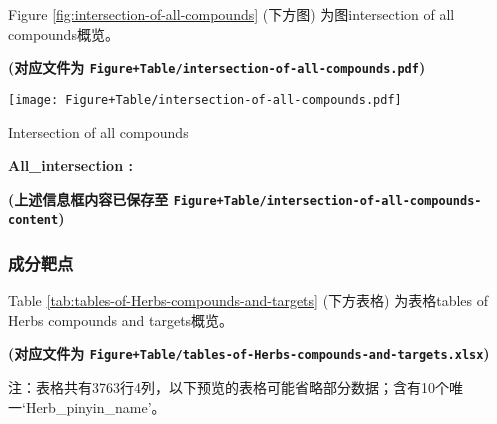 \documentclass[
]{article}
\begin{document}
Figure \ref{fig:intersection-of-all-compounds} (下方图) 为图intersection of all compounds概览。

\textbf{(对应文件为 \texttt{Figure+Table/intersection-of-all-compounds.pdf})}

\def\@captype{figure}
\begin{center}
\texttt{[image: Figure+Table/intersection-of-all-compounds.pdf]}
\caption{Intersection of all compounds}\label{fig:intersection-of-all-compounds}
\end{center}
\begin{center}\begin{tcolorbox}[colback=gray!10, colframe=gray!50, width=0.9\linewidth, arc=1mm, boxrule=0.5pt]
\textbf{
All\_intersection
:}

\vspace{0.5em}



\vspace{2em}
\end{tcolorbox}
\end{center}

\textbf{(上述信息框内容已保存至 \texttt{Figure+Table/intersection-of-all-compounds-content})}

\hypertarget{ux6210ux5206ux9776ux70b9}{%
\subsubsection{成分靶点}\label{ux6210ux5206ux9776ux70b9}}

Table \ref{tab:tables-of-Herbs-compounds-and-targets} (下方表格) 为表格tables of Herbs compounds and targets概览。

\textbf{(对应文件为 \texttt{Figure+Table/tables-of-Herbs-compounds-and-targets.xlsx})}

\begin{center}\begin{tcolorbox}[colback=gray!10, colframe=gray!50, width=0.9\linewidth, arc=1mm, boxrule=0.5pt]注：表格共有3763行4列，以下预览的表格可能省略部分数据；含有10个唯一`Herb\_pinyin\_name'。
\end{tcolorbox}
\end{center}
\end{document}

